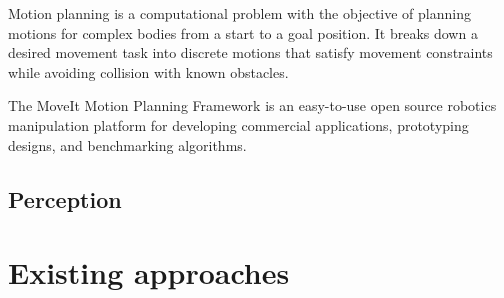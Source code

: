 
    \par Motion planning is a computational problem with the objective of planning motions for complex bodies from a start to a goal position. It breaks down a desired movement task into discrete motions that satisfy movement constraints while avoiding collision with known obstacles. 
    \par The MoveIt Motion Planning Framework is an easy-to-use open source robotics manipulation platform for developing commercial applications, prototyping designs, and benchmarking algorithms.









\subsection{Perception}





\section{Existing approaches}

